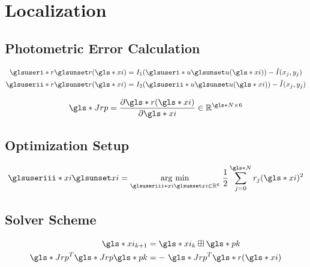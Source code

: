 \section{Localization}

\subsection{Photometric Error Calculation}
\label{sec:methods-localization-photometric}
    
\begin{align*}
  \gi{r}(\g{xi}) &= I_1(\gi{u}(\g{xi})) - \hat{I}(x_j, y_j) \\
  \gii{r}(\g{xi}) &= I_2(\gii{u}(\g{xi})) - \hat{I}(x_j, y_j)
\end{align*}
    
\begin{equation*}
  \g{Jrp} = \frac{\partial \g{r}(\g{xi})}{\partial\g{xi}}
  \inR{\g{N} \times 6}
\end{equation*}

\subsection{Optimization Setup}
\label{sec:methods-localization-optimization}

\begin{equation*}
  \giii{xi} =  \argmin{\giii{xi}\inR{6}} \frac{1}{2} 
  \sum_{j = 0}^{\g{N}} r_j(\g{xi})^2
\end{equation*}

\subsection{Solver Scheme}
\label{sec:methods-localization-scheme}
    
\begin{align*}
  \g{xi}_{k+1} &= \g{xi}_k \boxplus \g{pk} \\
  \g{Jrp}^T \g{Jrp} \g{pk} &= - \g{Jrp} ^T \g{r}(\g{xi})
\end{align*}
